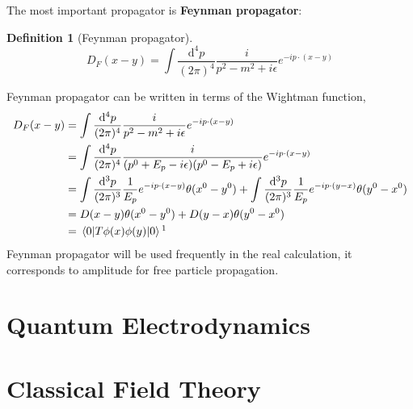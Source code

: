 \documentclass[12pt]{article}
\numberwithin{equation}{section}
\theoremstyle{1style}
\newtheorem{definition}[equation]{Definition}
\newcommand{\tbf}[1]{\textbf{#1}}
\newcommand{\id}{\mathrm{d}}
\begin{document}
The most important propagator is \tbf{Feynman propagator}:
\begin{definition}[Feynman propagator]
  \begin{equation*}
    D_{F}(x-y)=\int \frac{\id^4p}{(2\pi)^4}\frac{i}{p^2-m^2+i\epsilon}e^{-ip\cdot(x-y)}
  \end{equation*}
\end{definition}
Feynman propagator can be written in terms of the Wightman function,
\begin{align}
  D_{F}(x-y)&=\int \frac{\id^4p}{(2\pi)^4}\frac{i}{p^2-m^2+i\epsilon}e^{-ip\cdot(x-y)}\\
&=\int \frac{\id^4p}{(2\pi)^4}\frac{i}{(p^0+E_p-i\epsilon)(p^0-E_p+i\epsilon)}e^{-ip\cdot(x-y)}\\
&=\int\frac{\id^3p}{(2\pi)^3}\frac{1}{E_p}e^{-ip\cdot(x-y)}\theta(x^0-y^0)+\int\frac{\id^3p}{(2\pi)^3}\frac{1}{E_p}e^{-ip\cdot(y-x)}\theta(y^0-x^0)\\
&=D(x-y)\theta(x^0-y^0)+D(y-x)\theta(y^0-x^0)\\
&=\expval{T\phi(x)\phi(y)}{0}\footnotemark
\end{align}
Feynman propagator will be used frequently in the real calculation, it corresponds to amplitude for free particle propagation.


















\newpage
\section{Quantum Electrodynamics}


\newpage
\appendix
{}

\section{Classical Field Theory}



\newpage
\end{document}
